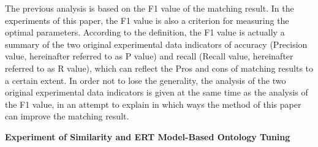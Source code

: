 \documentclass[twoside]{article}
\begin{document}
The previous analysis is based on the F1 value of the matching result. In the experiments of this paper, the F1 value is also a criterion for measuring the optimal parameters.
According to the definition, the F1 value is actually a summary of the two original experimental data indicators of accuracy (Precision value, hereinafter referred to as P value) and recall (Recall value, hereinafter referred to as R value), which can reflect the Pros and cons of matching results to a certain extent.
In order not to lose the generality,  the analysis of the two original experimental data indicators is given at the same time as the analysis of the F1 value, in an attempt to explain in which ways the method of this paper can improve the matching result.

{\bf Experiment of Similarity and ERT Model-Based Ontology Tuning}

\end{document}
